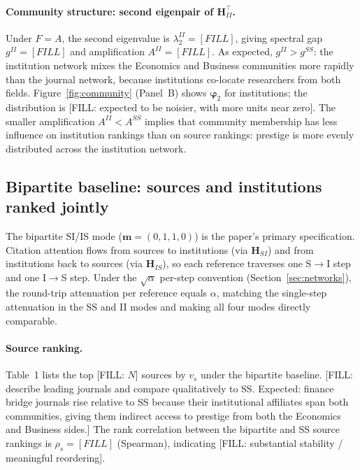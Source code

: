 \paragraph{Community structure: second eigenpair of $\mathbf{H}_{II}^\top$.}
Under $F=A$, the second eigenvalue is $\lambda_2^{II}=[FILL]$,
giving spectral gap $g^{II}=[FILL]$ and amplification
$A^{II}=[FILL]$.
As expected, $g^{II}>g^{SS}$: the institution network mixes the
Economics and Business communities more rapidly than the journal network,
because institutions co-locate researchers from both fields.
Figure~\ref{fig:community} (Panel~B) shows $\boldsymbol{\varphi}_2$
for institutions; the distribution is [FILL: expected to be noisier, with
more units near zero].
The smaller amplification $A^{II}<A^{SS}$ implies that community
membership has less influence on institution rankings than on source
rankings: prestige is more evenly distributed across the institution
network.

\subsection{Bipartite baseline: sources and institutions ranked jointly}
\label{sec:results_bipartite}

The bipartite SI/IS mode ($\mathbf{m}=(0,1,1,0)$) is the paper's
primary specification.
Citation attention flows from sources to institutions (via
$\mathbf{H}_{SI}$) and from institutions back to sources (via
$\mathbf{H}_{IS}$), so each reference traverses one S$\to$I step and one
I$\to$S step.
Under the $\sqrt{\alpha}$ per-step convention (Section~\ref{sec:networks}),
the round-trip attenuation per reference equals $\alpha$, matching the
single-step attenuation in the SS and II modes and making all four modes
directly comparable.

\paragraph{Source ranking.}
Table~1 lists the top [FILL: $N$] sources by $v_s$ under the bipartite
baseline.
[FILL: describe leading journals and compare qualitatively to SS.
Expected: finance bridge journals rise relative to SS because their
institutional affiliates span both communities, giving them indirect
access to prestige from both the Economics and Business sides.]
The rank correlation between the bipartite and SS source rankings is
$\rho_s=[FILL]$ (Spearman), indicating [FILL: substantial stability /
meaningful reordering].

